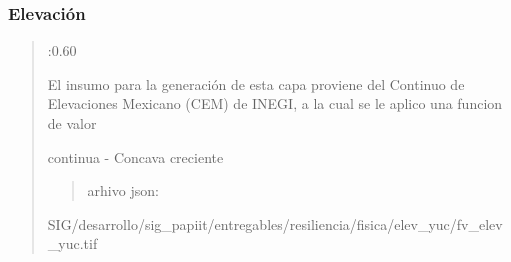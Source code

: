 \documentclass[letterpaper,10pt,spanish]{sphinxmanual}
\begin{document}
\subsubsection{Elevación}
\label{\detokenize{resiliencia:elevacion}}
\begin{quote}

:0.60


     El insumo para la generación de esta capa proviene del Continuo de Elevaciones Mexicano (CEM) de INEGI,
a la cual se le aplico una funcion de valor 

 continua - Concava creciente
\begin{quote}

arhivo json:

\begin{quote}

\noindent{}
\end{quote}
\end{quote}

 SIG/desarrollo/sig\_papiit/entregables/resiliencia/fisica/elev\_yuc/fv\_elev\_yuc.tif


\end{quote}
\end{document}
